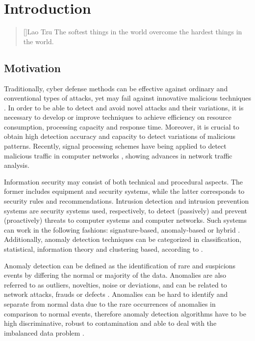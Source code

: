 \chapter{Introduction}
\label{ch:1_introduction}

\begin{quotation}[]{Lao Tzu}
The softest things in the world overcome the hardest things in the world.
\end{quotation}


\section{Motivation}
\label{sc:motivation}

Traditionally, cyber defense methods can be effective against ordinary and conventional types of attacks, yet may fail against innovative malicious techniques \cite{lakhina2005mining}. In order to be able to detect and avoid novel attacks and their variations, it is necessary to develop or improve techniques to achieve efficiency on resource consumption, processing capacity and response time. Moreover, it is crucial to obtain high detection accuracy and capacity to detect variations of malicious patterns. Recently, signal processing schemes have being applied to detect malicious traffic in computer networks \cite{Lu2009,Huang2009,Zonglin2009,david2011blind,da2012improved,tenorio2013greatest, vieira2017model}, showing advances in network traffic analysis.

Information security may consist of both technical and procedural aspects. The former includes equipment and security systems, while the latter corresponds to security rules and recommendations. Intrusion detection and intrusion prevention systems are security systems used, respectively, to detect (passively) and prevent (proactively) threats to computer systems and computer networks. Such systems can work in the following fashions: signature-based, anomaly-based or hybrid \cite{Huang2009,mudzingwa2012study}. Additionally, anomaly detection techniques can be categorized in classification, statistical, information theory and clustering based, according to \cite{bhuyan2014network,ahmed2016survey,osanaiye2016distributed}.

Anomaly detection can be defined as the identification of rare and suspicions events by differing the normal or majority of the data. Anomalies are also referred to as outliers, novelties, noise or deviations, and can be related to network attacks, frauds or defects \cite{bhuyan2014network,ahmed2016survey}. Anomalies can be hard to identify and separate from normal data due to the rare occurrences of anomalies in comparison to normal events, therefore anomaly detection algorithms have to be high discriminative, robust to contamination and able to deal with the imbalanced data problem \cite{he2008learning}.

